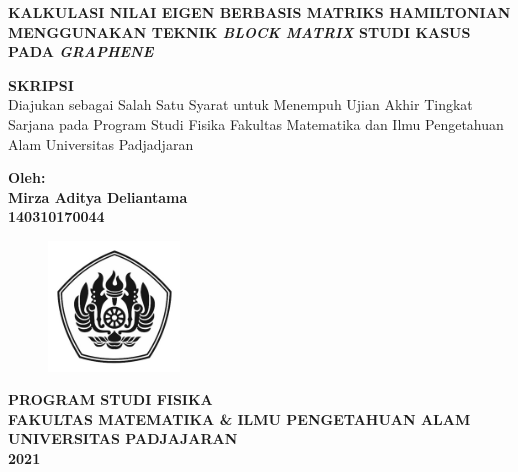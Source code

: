\documentclass[12pt,a4paper]{report}
\begin{document}
	\begin{onehalfspacing}
\begin{titlepage}
	\centering
	{\textbf{KALKULASI NILAI EIGEN BERBASIS MATRIKS HAMILTONIAN MENGGUNAKAN TEKNIK \textit{BLOCK MATRIX} STUDI KASUS PADA \textit{GRAPHENE}}}

	\vspace{2cm}

	\textbf{SKRIPSI} \\
	\vspace{0.5cm}
	Diajukan sebagai Salah Satu Syarat untuk Menempuh Ujian Akhir Tingkat Sarjana pada Program Studi Fisika Fakultas Matematika dan Ilmu Pengetahuan Alam Universitas Padjadjaran

	\vspace{1cm}
	\textbf{Oleh: \\
	Mirza Aditya Deliantama\\
	140310170044}

	\vspace{1cm}
	\begin{figure}[!htbp]
		\centering
		\includegraphics[width=3.5cm]{gambar/unpadbw.png}
		\label{cover}
	\end{figure}

	\vspace{3cm}
	{\textbf{PROGRAM STUDI FISIKA \\
	FAKULTAS MATEMATIKA \& ILMU PENGETAHUAN ALAM \\
	UNIVERSITAS PADJAJARAN \\
	2021 \\}}
\end{titlepage}

\setcounter{page}{2}




\end{onehalfspacing}
\end{document}
